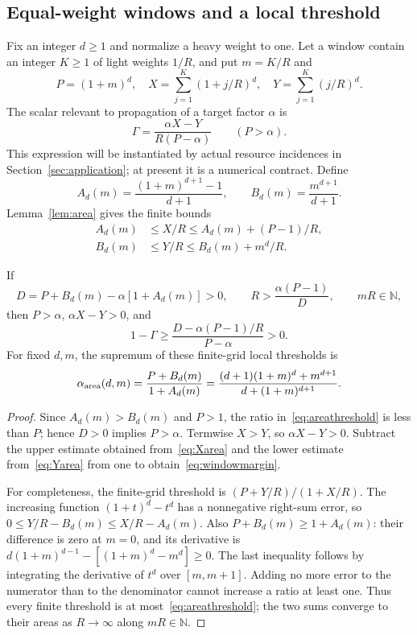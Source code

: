 \documentclass[manuscript,review,anonymous]{acmart}
\newcommand{\N}{\mathbb N}
\begin{document}
\subsection{Equal-weight windows and a local threshold}
Fix an integer $d\ge1$ and normalize a heavy weight to one. Let a window contain an integer $K\ge1$ of light weights $1/R$, and put $m=K/R$ and
\[
 P=(1+m)^d,\quad
 X=\sum_{j=1}^K(1+j/R)^d,\quad
 Y=\sum_{j=1}^K(j/R)^d.
\]
The scalar relevant to propagation of a target factor $\alpha$ is
\begin{equation}\label{eq:gamma}
 \Gamma=\frac{\alpha X-Y}{R(P-\alpha)}\qquad(P>\alpha).
\end{equation}
This expression will be instantiated by actual resource incidences in Section~\ref{sec:application}; at present it is a numerical contract. Define
\[
 A_d(m)=\frac{(1+m)^{d+1}-1}{d+1},\qquad
 B_d(m)=\frac{m^{d+1}}{d+1}.
\]
Lemma~\ref{lem:area} gives the finite bounds
\begin{align}
 A_d(m)&\le X/R\le A_d(m)+(P-1)/R,\label{eq:Xarea}\\
 B_d(m)&\le Y/R\le B_d(m)+m^d/R.\label{eq:Yarea}
\end{align}
\begin{proposition}\label{prop:window}
If
\[
 D=P+B_d(m)-\alpha[1+A_d(m)]>0,\qquad
 R>\frac{\alpha(P-1)}D,\qquad mR\in\N,
\]
then $P>\alpha$, $\alpha X-Y>0$, and
\begin{equation}\label{eq:windowmargin}
 1-\Gamma\ge\frac{D-\alpha(P-1)/R}{P-\alpha}>0.
\end{equation}
For fixed $d,m$, the supremum of these finite-grid local thresholds is
\begin{equation}\label{eq:areathreshold}
 \alpha_{\rm area}(d,m)
 =\frac{P+B_d(m)}{1+A_d(m)}
 =\frac{(d+1)(1+m)^d+m^{d+1}}{d+(1+m)^{d+1}}.
\end{equation}
\end{proposition}
\begin{proof}
Since $A_d(m)>B_d(m)$ and $P>1$, the ratio in~\eqref{eq:areathreshold} is less than $P$; hence $D>0$ implies $P>\alpha$. Termwise $X>Y$, so $\alpha X-Y>0$. Subtract the upper estimate obtained from~\eqref{eq:Xarea} and the lower estimate from~\eqref{eq:Yarea} from one to obtain~\eqref{eq:windowmargin}.

For completeness, the finite-grid threshold is $(P+Y/R)/(1+X/R)$. The increasing function $(1+t)^d-t^d$ has a nonnegative right-sum error, so $0\le Y/R-B_d(m)\le X/R-A_d(m)$. Also $P+B_d(m)\ge1+A_d(m)$: their difference is zero at $m=0$, and its derivative is $d(1+m)^{d-1}-[(1+m)^d-m^d]\ge0$. The last inequality follows by integrating the derivative of $t^d$ over $[m,m+1]$. Adding no more error to the numerator than to the denominator cannot increase a ratio at least one. Thus every finite threshold is at most~\eqref{eq:areathreshold}; the two sums converge to their areas as $R\to\infty$ along $mR\in\N$.
\end{proof}
\end{document}

